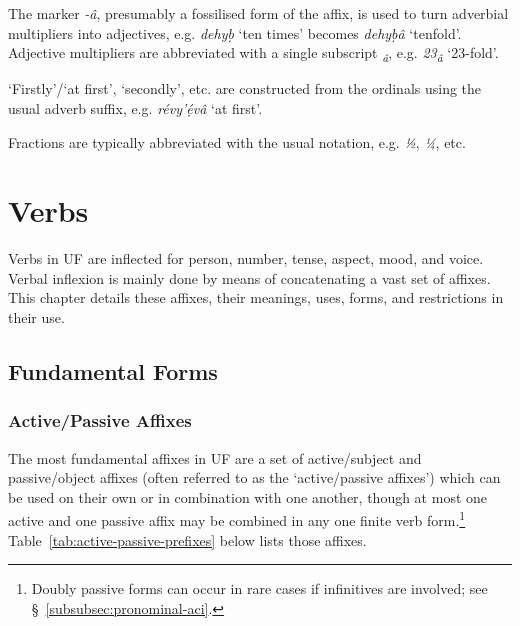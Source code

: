 \documentclass[a4paper, 12pt, twoside, final]{article}
\let \w \textit
\let \Sub \textsubscript
\begin{document}
The marker \w{-â}, presumably a fossilised form of the  affix, is used to turn adverbial multipliers into
adjectives, e.g. \w{dehyḅ} ‘ten times’ becomes \w{dehyḅâ} ‘tenfold’. Adjective multipliers are abbreviated with a single
subscript \w{\Sub{â}}, e.g. \w{23\Sub{â}} ‘23-fold’.

‘Firstly’/‘at first’, ‘secondly’, etc. are constructed from the ordinals using the usual adverb suffix, e.g.
\w{révy’ẹ́vâ} ‘at first’.

Fractions are typically abbreviated with the usual notation, e.g. \w{½}, \w{¼}, etc.

\section{Verbs}\label{subsec:verbal-morphology}
Verbs in UF are inflected for person, number, tense, aspect, mood, and voice. Verbal inflexion is mainly done
by means of concatenating a vast set of affixes. This chapter details these affixes, their meanings, uses,
forms, and restrictions in their use.

\subsection{Fundamental Forms}
\subsubsection{Active/Passive Affixes}\label{subsubsec:active-passive-affixes}
The most fundamental affixes in UF are a set of active/subject and passive/object affixes (often referred to as the
‘active/passive affixes’) which can be used on their own or in combination
with one another, though at most one active and one passive affix may be combined in any one finite verb form.\footnote{Doubly
passive forms can occur in rare cases if infinitives are involved; see §~\ref{subsubsec:pronominal-aci}.}
Table~\ref{tab:active-passive-prefixes} below lists those affixes.
\end{document}
